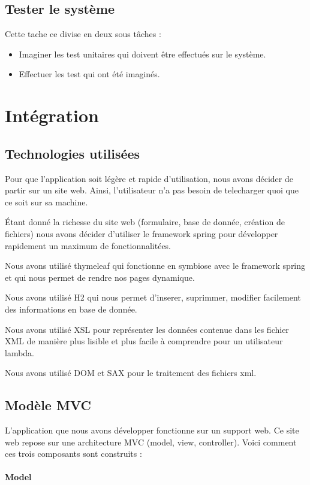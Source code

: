 \documentclass{article}
\begin{document}
\subsection{Tester le système}
Cette tache ce divise en deux sous tâches :
\begin{itemize}
  \item Imaginer les test unitaires qui doivent être effectués sur le système.
  \item Effectuer les test qui ont été imaginés.
\end{itemize}


\section{Intégration}
\subsection{Technologies utilisées}
Pour que l'application soit légère et rapide d'utilisation, nous avons décider de partir sur un site web. Ainsi, l'utilisateur n'a pas besoin de telecharger quoi que ce soit sur sa machine.

Étant donné la richesse du site web (formulaire, base de donnée, création de fichiers) nous avons décider d'utiliser le framework spring pour développer rapidement un maximum de fonctionnalitées.

Nous avons utilisé thymeleaf qui fonctionne en symbiose avec le framework spring et qui nous permet de rendre nos pages dynamique.

Nous avons utilisé H2 qui nous permet d'inserer, suprimmer, modifier facilement des informations en base de donnée.

Nous avons utilisé XSL pour représenter les données contenue dans les fichier XML de manière plus lisible et plus facile à comprendre pour un utilisateur lambda.

Nous avons utilisé DOM et SAX pour le traitement des fichiers xml.
\subsection{Modèle MVC}
L'application que nous avons développer fonctionne sur un support web. Ce site web repose sur une architecture MVC (model, view, controller). Voici comment ces trois composants sont construits :

\paragraph{Model}
\end{document}

